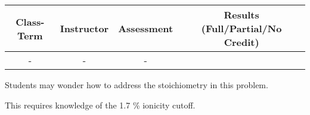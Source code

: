 \begin{outcomes}
\begin{center}
	\begin{tabular}{cccc}
		\hline\hline
                Class-Term & Instructor & Assessment & Results (Full/Partial/No Credit) \\
		\hline
                - & - & - &  \\
		\hline
	\end{tabular}
\end{center}
\end{outcomes}
\begin{comments}

Students may wonder how to address the stoichiometry in this problem.

This requires knowledge of the 1.7 \% ionicity cutoff.

	
\end{comments}